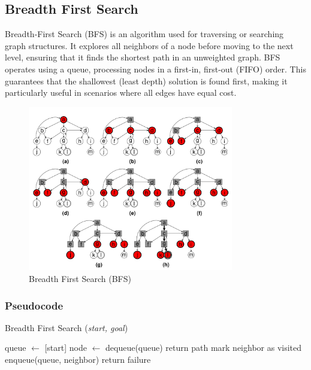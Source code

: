 \subsection{Breadth First Search}
\noindent Breadth-First Search (BFS) is an algorithm used for traversing or searching graph structures. It explores all neighbors of a node before moving to the next level, ensuring that it finds the shortest path in an unweighted graph. BFS operates using a queue, processing nodes in a first-in, first-out (FIFO) order. This guarantees that the shallowest (least depth) solution is found first, making it particularly useful in scenarios where all edges have equal cost.

\begin{figure}[H]
	\centering
	\includegraphics[width=0.8\textwidth]{./imgs/bfs.png}
	\caption{Breadth First Search (BFS)}
\end{figure}

\subsubsection{Pseudocode}
\begin{algorithm}[H]
	\caption{Breadth First Search (\textit{start, goal})}\label{alg:bfs}
	\begin{algorithmic}[1]
		\State queue \(\gets\) [start]
		\State node \(\gets\) dequeue(queue)
		\State return path
		\EndIf
		\State mark neighbor as visited
		\State enqueue(queue, neighbor)
		\EndIf
		\EndFor
		\EndWhile
		\State return failure
	\end{algorithmic}
\end{algorithm}

